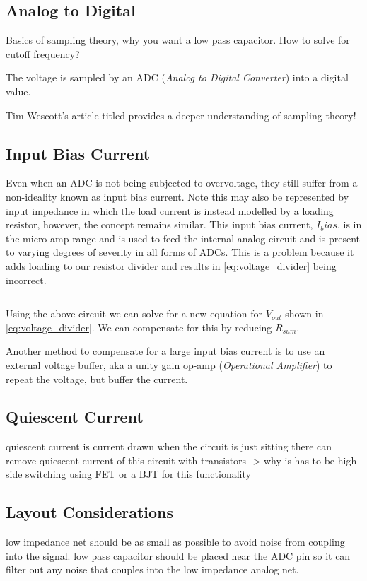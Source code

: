 \documentclass[main.tex]{subfiles}
\begin{document}
\subsection{Analog to Digital}

Basics of sampling theory, why you want a low pass capacitor. How to solve for cutoff frequency? 

The voltage is sampled by an ADC (\textit{Analog to Digital Converter}) into a digital value. 

Tim Wescott's article titled  provides a deeper understanding of sampling theory! 

\subsection{Input Bias Current}
Even when an ADC is not being subjected to overvoltage, they still suffer from a non-ideality known as input bias current. Note this may also be represented by input impedance in which the load current is instead modelled by a loading resistor, however, the concept remains similar. This input bias current, $I_bias$, is in the micro-amp range and is used to feed the internal analog circuit and is present to varying degrees of severity in all forms of ADCs. This is a problem because it adds loading to our resistor divider and results in \eqref{eq:voltage_divider} being incorrect. 


\begin{equation}
    \label{eq:loaded_voltage_divider}
\end{equation} 

Using the above circuit we can solve for a new equation for $V_{out}$ shown in \eqref{eq:voltage_divider}. We can compensate for this by reducing $R_{sum}$. 

Another method to compensate for a large input bias current is to use an external voltage buffer, aka a unity gain op-amp (\textit{Operational Amplifier}) to repeat the voltage, but buffer the current. 



\subsection{Quiescent Current}
quiescent current is current drawn when the circuit is just sitting there
can remove quiescent current of this circuit with transistors -> why is has to be high side switching
using FET or a BJT for this functionality

\subsection{Layout Considerations}
low impedance net should be as small as possible to avoid noise from coupling into the signal. 
low pass capacitor should be placed near the ADC pin so it can filter out any noise that couples into the low impedance analog net. 
\end{document}
